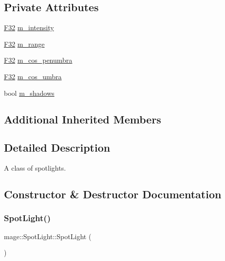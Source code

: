 \subsection*{Private Attributes}
\begin{DoxyCompactItemize}
\item 
\hyperlink{namespacemage_aa97e833b45f06d60a0a9c4fc22ae02c0}{F32} \hyperlink{classmage_1_1_spot_light_a79110b6604c73210ba13725be7b66606}{m\+\_\+intensity}
\item 
\hyperlink{namespacemage_aa97e833b45f06d60a0a9c4fc22ae02c0}{F32} \hyperlink{classmage_1_1_spot_light_a53922fe395997f12003cd2dbc2f3ca7a}{m\+\_\+range}
\item 
\hyperlink{namespacemage_aa97e833b45f06d60a0a9c4fc22ae02c0}{F32} \hyperlink{classmage_1_1_spot_light_ac4448bbc1c8a924141d2798c3365047a}{m\+\_\+cos\+\_\+penumbra}
\item 
\hyperlink{namespacemage_aa97e833b45f06d60a0a9c4fc22ae02c0}{F32} \hyperlink{classmage_1_1_spot_light_aa2ec430d0f95d082112260b5d9640d50}{m\+\_\+cos\+\_\+umbra}
\item 
bool \hyperlink{classmage_1_1_spot_light_aa744a471d0f1b39eb5ee435611bb42fe}{m\+\_\+shadows}
\end{DoxyCompactItemize}
\subsection*{Additional Inherited Members}


\subsection{Detailed Description}
A class of spotlights. 

\subsection{Constructor \& Destructor Documentation}
\hypertarget{classmage_1_1_spot_light_ae82577a45cf84c375a58b1789a05ce0d}{}\label{classmage_1_1_spot_light_ae82577a45cf84c375a58b1789a05ce0d} 
\subsubsection{\texorpdfstring{Spot\+Light()}{SpotLight()}\hspace{0.1cm}{\footnotesize\ttfamily [1/3]}}
{\footnotesize\ttfamily mage\+::\+Spot\+Light\+::\+Spot\+Light (\begin{DoxyParamCaption}{ }\end{DoxyParamCaption})\hspace{0.3cm}{\ttfamily [noexcept]}}

